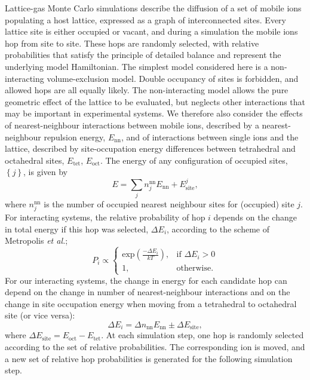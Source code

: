 \documentclass[aps,prb,twocolumn,superscriptaddress,reprint]{revtex4-1}
\newcommand{\set}[1]{\left\{#1\right\}}
\newcommand{\m}[1]{\mathrm{#1}}
\begin{document}
Lattice-gas Monte Carlo simulations describe the diffusion of a set of mobile ions populating a host lattice, expressed as a graph of interconnected sites.\cite{Trudeau_GraphTheoryBook} 
Every lattice site is either occupied or vacant, and during a simulation the mobile ions hop from site to site. 
These hops are randomly selected, with relative probabilities that satisfy the principle of detailed balance and represent the underlying model Hamiltonian. 
The simplest model considered here is a non-interacting volume-exclusion model.\cite{Kutner_PhysLett1981} Double occupancy of sites is forbidden, and allowed hops are all equally likely. 
The non-interacting model allows the pure geometric effect of the lattice to be evaluated, but neglects other interactions that may be important in experimental systems. 
We therefore also consider the effects of nearest-neighbour interactions between mobile ions, described by a nearest-neighbour repulsion energy, $E_\m{nn}$, and of interactions between single ions and the lattice, described by site-occupation energy differences between tetrahedral and octahedral sites, $E_\m{tet}$, $E_\m{oct}$. 
The energy of any configuration of occupied sites, $\set{j}$, is given by
\begin{equation}
  E = \sum_j n_j^\m{nn}E_\m{nn} + E_\m{site}^j,
\end{equation}
where $n^\m{nn}_j$ is the number of occupied nearest neighbour sites for (occupied) site $j$. 
For interacting systems, the relative probability of hop $i$ depends on the change in total energy if this hop was selected, $\Delta E_i$, according to the scheme of Metropolis \emph{et al.}\cite{MetropolisEtAl_JChemPhys1953};
\begin{equation}
  P_i \propto 
  \begin{cases}
    \m{exp}\left(\frac{-\Delta E_i}{kT}\right),& \m{if}\,\,\Delta E_i > 0 \\
    1,                                        & \m{otherwise.}
  \end{cases}
  \label{eqn:metropolis}
\end{equation}
For our interacting systems, the change in energy for each candidate hop can depend on the change in number of nearest-neighbour interactions and on the change in site occupation energy when moving from a tetrahedral to octahedral site (or vice versa):
\begin{equation}
  \Delta E_i = \Delta n_\m{nn}E_\m{nn} \pm \Delta E_\m{site},
\end{equation}
where $\Delta E_\mathrm{site}=E_\mathrm{oct}-E_\mathrm{tet}$.
At each simulation step, one hop is randomly selected according to the set of relative probabilities. 
The corresponding ion is moved, and a new set of relative hop probabilities is generated for the following simulation step.
\end{document}
